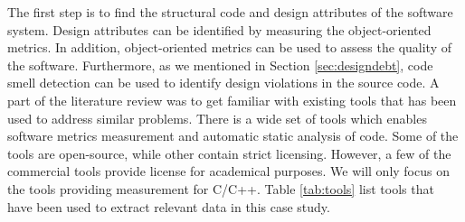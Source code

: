 The first step is to find the structural code and design attributes of the software system. Design attributes can be identified by measuring the object-oriented metrics. In addition, object-oriented metrics can be used to assess the quality of the software. Furthermore, as we mentioned in Section \ref{sec:designdebt}, code smell detection can be used to identify design violations in the source code. A part of the literature review was to get familiar with existing tools that has been used to address similar problems. There is a wide set of tools which enables software metrics measurement and automatic static analysis of code. Some of the tools are open-source, while other contain strict licensing. However, a few of the commercial tools provide license for academical purposes. We will only focus on the tools providing measurement for C/C++. Table \ref{tab:tools} list tools that have been used to extract relevant data in this case study. 

